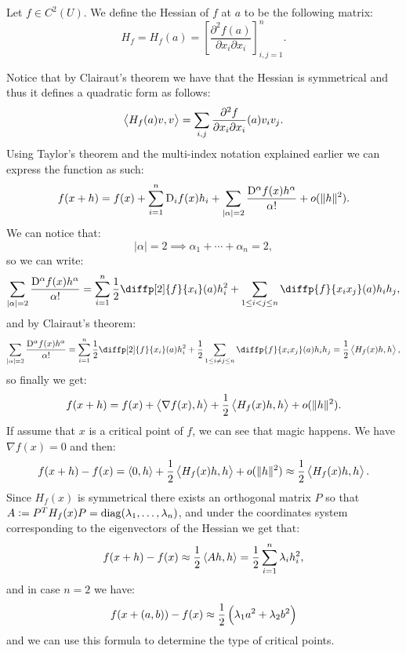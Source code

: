 \documentclass[11pt,a4paper]{article}
\begin{document}

\begin{definition}[Hessian]
  Let $f \in C^2(U)$.
  We define the Hessian of $f$ at $a$ to be the following matrix:
  \[
    H_f = H_f(a) = 
    \left[ \frac{\partial^2 f(a)}{\partial x_i \partial x_i} \right]_
    {i,j = 1}^{n}.
  \]
\end{definition}

Notice that by Clairaut's theorem we have that the Hessian is symmetrical
and thus it defines a quadratic form as follows:
\[
  \left\langle H_f(a)v, v \right\rangle = \sum_{i,j}
  {\frac{\partial^2 f}{\partial x_i \partial x_i}(a)v_i v_j}.
\]
Using Taylor's theorem and the multi-index notation explained earlier
we can express the function as such:
\[
  f(x + h) = f(x) + \sum_{i=1}^{n}{\mathrm{D}_i f(x) h_i} + 
  \sum_{|\alpha| = 2}{\frac{\mathrm{D}^\alpha f(x) h^\alpha}{\alpha!}} + o(\|h\|^2).
\]
We can notice that:
\[
  |\alpha| = 2 \implies \alpha_1 + \cdots + \alpha_n = 2,
\]
so we can write:
\[
  \sum_{|\alpha| = 2}{\frac{\Dif^\alpha f(x) h^\alpha}{\alpha!}} =
  \sum_{i=1}^{n} \half \diffp[2]{f}{x_i}(a) h_i^2 +
  \sum_{1 \le i < j \le n} \diffp{f}{{x_i}{x_j}} (a) h_i h_j,
\]
and by Clairaut's theorem:
\[
  \sum_{|\alpha| = 2}{\frac{\Dif^\alpha f(x) h^\alpha}{\alpha!}} =
  \sum_{i=1}^{n} \half \diffp[2]{f}{x_i}(a) h_i^2 +
  \half \sum_{1 \le i \neq j \le n} \diffp{f}{{x_i}{x_j}} (a) h_i h_j =
  \frac{1}{2}\ip{H_f(x)h}{h},
\]
so finally we get:
\[
  f(x + h) = f(x) + \left\langle \nabla f(x), h \right\rangle + \frac{1}{2}\left\langle H_f(x)h, h \right\rangle
  + o(\|h\|^2).
\]
If assume that $x$ is a critical point of $f$, we can see that magic happens.
We have $\nabla f(x) = 0$ and then:
\[
  f(x + h) - f(x) = \left\langle 0, h \right\rangle + \frac{1}{2}\left\langle H_f(x)h, h \right\rangle
  + o(\|h\|^2) \approx \frac{1}{2}\left\langle H_f(x)h, h \right\rangle.
\]
Since $H_f(x)$ is symmetrical there exists an orthogonal matrix $P$
so that $A := P^T H_f(x) P = \operatorname{diag}(\lambda_1,\dots,\lambda_n)$,
and under the coordinates system corresponding to the eigenvectors
of the Hessian we get that:
\[
  f(x + h) - f(x) \approx \frac{1}{2}\left\langle Ah, h \right\rangle = 
  \frac{1}{2} \sum_{i=1}^{n}{\lambda_i h_i^2},
\]
and in case $n = 2$ we have:
\[
  f(x + (a,b)) - f(x) \approx \half \del{\lambda_1 a^2 + \lambda_2 b^2}
\]
and we can use this formula to determine the type of critical points.
\end{document}
